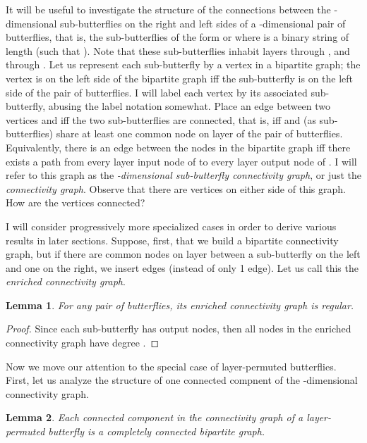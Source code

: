 \documentclass[12pt]{article}
\newtheorem{lemma}{Lemma}
\begin{document}
It will be useful to investigate the structure of the connections between
the -dimensional sub-butterflies on the right and left sides of
a -dimensional pair of butterflies, that is, the sub-butterflies of the
 form  or  where  is a binary string of length  (such that
).  Note that these sub-butterflies inhabit layers  through
 , and  through .  Let us represent each 
sub-butterfly by a vertex in a bipartite graph; the vertex is on the left
side of the bipartite graph iff the sub-butterfly is on the left
side of the pair of butterflies.  I will label each vertex by its associated
sub-butterfly, abusing the label notation somewhat.  
Place an edge between two vertices  and  iff
the two sub-butterflies are connected, that is, iff  and 
(as sub-butterflies) share at least
one common node on layer  of the pair of butterflies.
Equivalently, there is an edge between the nodes in the bipartite graph
iff there exists a path from every layer  input node 
of  to every layer  output node of . 
I will refer to this graph as the \emph{-dimensional 
sub-butterfly connectivity graph},
or just the \emph{connectivity graph}.
Observe that there are  vertices
on either side of this graph.  How are the vertices connected?

I will consider progressively more specialized cases in order to derive 
various results in later sections.  Suppose, first, that we build a bipartite
connectivity graph, but if there are  common nodes on layer  
between a sub-butterfly on the left and one on the right, 
we insert  edges (instead of only 1 edge).  Let us call this the 
\emph{enriched connectivity graph}.  

\begin{lemma} \label{enriched graph is regular}
For any pair of butterflies, its enriched connectivity graph is regular.
\end{lemma}

\begin{proof} Since each sub-butterfly has  output nodes, then all 
nodes in the enriched connectivity graph have degree .
\end{proof}

Now we move our attention to the special case of layer-permuted butterflies.
First, let us analyze the structure of one connected compnent of
the -dimensional connectivity graph.

\begin{lemma} \label{connected components}
Each connected component in the connectivity graph of a layer-permuted
butterfly is a completely connected bipartite graph.
\end{lemma}
\end{document}
